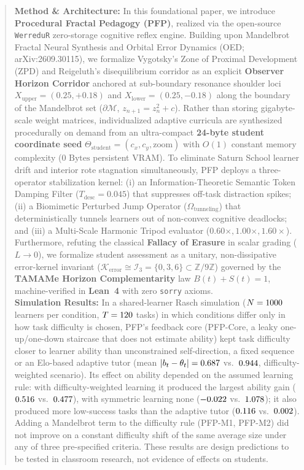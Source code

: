 \documentclass[10pt,twocolumn,a4paper]{article}
\begin{document}
\begin{@twocolumnfalse}
\begin{abstract}
      \textbf{Method \& Architecture:} In this foundational paper, we introduce \textbf{Procedural Fractal Pedagogy (PFP)}, realized via the open-source \texttt{WerreduR} zero-storage cognitive reflex engine. Building upon Mandelbrot Fractal Neural Synthesis and Orbital Error Dynamics (OED; arXiv:2609.30115), we formalize Vygotsky's Zone of Proximal Development (ZPD) and Reigeluth's disequilibrium corridor as an explicit \textbf{Observer Horizon Corridor} anchored at sub-boundary resonance shoulder loci $X_{\text{upper}} = (0.25, +0.18)$ and $X_{\text{lower}} = (0.25, -0.18)$ along the boundary of the Mandelbrot set ($\partial\mathcal{M}$, $z_{n+1} = z_n^2 + c$). Rather than storing gigabyte-scale weight matrices, individualized adaptive curricula are synthesized procedurally on demand from an ultra-compact \textbf{24-byte student coordinate seed} $\Theta_{\text{student}} = (c_x, c_y, \text{zoom})$ with $O(1)$ constant memory complexity ($0\text{ Bytes}$ persistent VRAM). To eliminate Saturn School learner drift and interior rote stagnation simultaneously, PFP deploys a three-operator stabilization kernel: (i) an Information-Theoretic Semantic Token Damping Filter ($T_{\text{desc}} = 0.045$) that suppresses off-task distraction spikes; (ii) a Biomimetic Perturbed Jump Operator ($\Omega_{\text{tunneling}}$) that deterministically tunnels learners out of non-convex cognitive deadlocks; and (iii) a Multi-Scale Harmonic Tripod evaluator ($0.60\times, 1.00\times, 1.60\times$). Furthermore, refuting the classical \textbf{Fallacy of Erasure} in scalar grading ($L \to 0$), we formalize student assessment as a unitary, non-dissipative error-kernel invariant ($\mathcal{K}_{\text{error}} \cong \mathcal{I}_3 = \{0, 3, 6\} \subset \mathbb{Z}/9\mathbb{Z}$) governed by the \textbf{TAMAMe Horizon Complementarity} law $B(t) + S(t) = 1$, machine-verified in \textbf{Lean~4} with zero \texttt{sorry} axioms. \\
      \textbf{Simulation Results:} In a shared-learner Rasch simulation ($N = \RaschN$ learners per condition, $T = \RaschT$ tasks) in which conditions differ only in how task difficulty is chosen, PFP's feedback core (PFP-Core, a leaky one-up/one-down staircase that does not estimate ability) kept task difficulty closer to learner ability than unconstrained self-direction, a fixed sequence or an Elo-based adaptive tutor (mean $|b_t-\theta_t| = \mCoreTrackTwo$ vs.\ $\mCATTrackTwo$, difficulty-weighted scenario). Its effect on ability depended on the assumed learning rule: with difficulty-weighted learning it produced the largest ability gain ($\mCoreGainTwo$ vs.\ $\mCATGainTwo$), with symmetric learning none ($\mCoreGainOne$ vs.\ $\mCATGainOne$); it also produced more low-success tasks than the adaptive tutor ($\mCoreFrustrTwo$ vs.\ $\mCATFrustrTwo$). Adding a Mandelbrot term to the difficulty rule (PFP-M1, PFP-M2) did not improve on a constant difficulty shift of the same average size under any of three pre-specified criteria. These results are design predictions to be tested in classroom research, not evidence of effects on students. \par\vspace{6pt}

\end{abstract}
\end{@twocolumnfalse}
\end{document}
